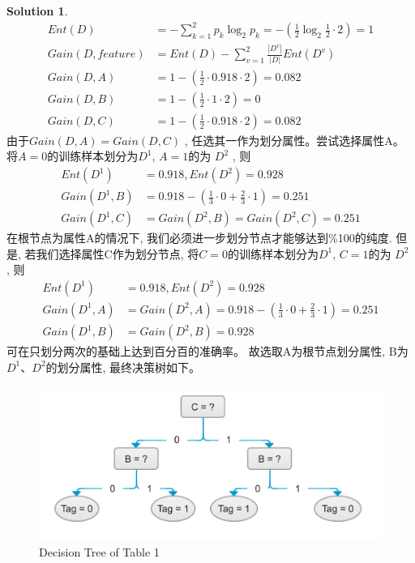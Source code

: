 \documentclass[a4paper,UTF8]{article}
\numberwithin{equation}{section}
\theoremstyle{definition}
\newtheorem*{solution}{Solution}
\begin{document}
\begin{solution}
\begin{equation}
\begin{split}
Ent(D) &= - \sum_{k=1}^2p_k\log_2p_k = - (\frac{1}{2}\log_2\frac{1}{2} \cdot 2 ) = 1 \\ 
Gain (D, feature) &= Ent(D) - \sum_{v=1}^2 \frac{|D^v|}{|D|} Ent(D^v) \\
Gain (D, A) &= 1 - (\frac{1}{2} \cdot  0.918 \cdot 2) = 0.082 \\
Gain (D, B) &= 1- (\frac{1}{2} \cdot 1 \cdot 2)  = 0 \\
Gain (D, C) &= 1 - (\frac{1}{2} \cdot  0.918 \cdot 2)  = 0.082 
\end{split}
\end{equation}
由于$Gain (D, A) = Gain (D, C)$ , 任选其一作为划分属性。尝试选择属性A。将$A=0$的训练样本划分为$D^1$, $A=1$的为 $D^2$ , 则 \\
\begin{equation}
\begin{split}
Ent(D^1) &= 0.918, Ent(D^2) = 0.928 \\
Gain (D^1, B) &=   0.918 - (\frac{1}{3} \cdot 0 +  \frac{2}{3} \cdot 1)  = 0.251 \\
Gain (D^1, C) &= Gain (D^2, B) =  Gain (D^2, C)  = 0.251
\end{split}
\end{equation}
在根节点为属性A的情况下, 我们必须进一步划分节点才能够达到\%100的纯度. 但是, 若我们选择属性C作为划分节点, 将$C=0$的训练样本划分为$D^1$, $C=1$的为 $D^2$ , 则 \\
\begin{equation}
\begin{split}
Ent(D^1) &= 0.918, Ent(D^2) = 0.928 \\
Gain (D^1, A) &= Gain (D^2, A)   = 0.918 - (\frac{1}{3} \cdot 0 +  \frac{2}{3} \cdot 1)  = 0.251 \\
Gain (D^1, B) &=  Gain(D^2, B) = 0.928
\end{split}
\end{equation}
可在只划分两次的基础上达到百分百的准确率。 故选取A为根节点划分属性, B为$D^1$、$D^2$的划分属性, 最终决策树如下。
\begin{figure}[H]{}
\centering 
\includegraphics[scale=0.3]{tree.png}
\caption{Decision Tree of Table 1 }
\end{figure} 
\end{solution}
\end{document}
